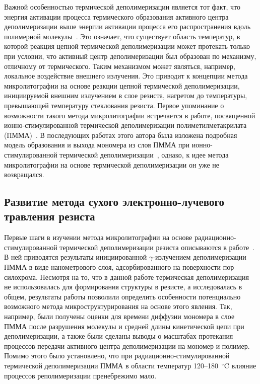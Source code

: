 Важной особенностью термической деполимеризации является тот факт, что энергия активации процесса термического образования активного центра деполимеризации выше энергии активации процесса его распространения вдоль полимерной молекулы~\cite{Cowley_1952_1, Sanchez-Jimenez_Ea}.
Это означает, что существует область температур, в которой реакция цепной термической деполимеризации может протекать только при условии, что активный центр деполимеризации был образован по механизму, отличному от термического.
Таким механизмом может являться, например, локальное воздействие внешнего излучения.
Это приводит к концепции метода микролитографии на основе реакции цепной термической деполимеризации, инициируемой внешним излучением в слое резиста, нагретом до температуры, превышающей температуру стеклования резиста.
Первое упоминание о возможности такого метода микролитографии встречается в работе, посвященной ионно-стимулированной термической деполимеризации полиметилметакрилата \linebreak (ПММА)~\cite{Fragala_1}.
В последующих работах этого автора была изложена подробная модель образования и выхода мономера из слоя \linebreak ПММА при ионно-стимулированной термической деполимеризации~\cite{Fragala_2,Fragala_3_diffusion}, \linebreak однако, к идее метода микролитографии на основе термической деполимеризации он уже не возвращался.


\subsection{Развитие метода сухого электронно-лучевого травления резиста}
Первые шаги в изучении метода микролитографии на основе радиационно-стимулированной термической деполимеризации резиста описываются в работе~\cite{Bruk_2000}. В ней приводятся результаты инициированной $\gamma$-излучением деполимеризации ПММА в виде нанометрового слоя, адсорбированного на поверхности пор силохрома. Несмотря на то, что в данной работе термическая деполимеризация не использовалась для формирования структуры в резисте, а исследовалась в общем, результаты работы позволили определить особенности потенциально возможного метода микроструктурирования на основе этого явления. Так, например, были получены оценки для времени диффузии мономера в слое ПММА после разрушения молекулы и средней длины кинетической цепи при деполимеризации, а также были сделаны выводы о масштабах протекания процессов передачи активного центра деполимеризации на мономер и полимер. Помимо этого было установлено, что при радиационно-стимулированной термической деполимеризации ПММА в области температур 120--180~$^\circ$C влияние процессов реполимеризации пренебрежимо мало.

